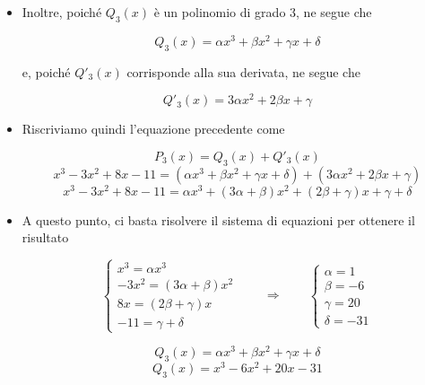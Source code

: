 \documentclass[a4paper, 12pt]{report}
\begin{document}
\begin{enumerate}
\begin{itemize}
\begin{itemize}
                \item Inoltre, poiché $Q_3(x)$ è un polinomio di grado 3, ne segue che
                
                \[ Q_3(x) = \alpha x^3 + \beta x^2 + \gamma x + \delta\]
                
                e, poiché $Q'_3(x)$ corrisponde alla sua derivata, ne segue che
                
                \[ Q'_3(x) = 3 \alpha x^2 + 2 \beta x + \gamma\]
                
                \item Riscriviamo quindi l'equazione precedente come
                
                \[ P_3(x) = Q_3(x)+Q'_3(x)\]
                \[ x^3-3x^2+8x-11 = (\alpha x^3 + \beta x^2 + \gamma x + \delta)+(3 \alpha x^2 + 2 \beta x + \gamma)\]
                \[ x^3-3x^2+8x-11 = \alpha x^3 + (3\alpha+\beta)x^2 + (2\beta+\gamma)x + \gamma + \delta\]
                
                \item A questo punto, ci basta risolvere il sistema di equazioni per ottenere il risultato
                
                \begin{center}
                    $$
                    \left \{ \begin{array}{l}
                        x^3 = \alpha x^3 \\
                        -3x^2 = (3\alpha+\beta)x^2 \\
                        8x = (2\beta+\gamma)x \\
                        -11 = \gamma + \delta
                    \end{array}
                    \right .
                    \qquad\Longrightarrow\qquad
                    \left \{ \begin{array}{l}
                        \alpha = 1 \\
                        \beta = -6 \\
                        \gamma = 20 \\
                        \delta = -31
                    \end{array}
                    \right .
                    $$
                \end{center}
                
                \[ Q_3(x) = \alpha x^3 + \beta x^2 + \gamma x + \delta\]
                \[ Q_3(x) = x^3 -6x^2 + 20x - 31\]
                

\end{itemize}
\end{itemize}
\end{enumerate}
\end{document}
